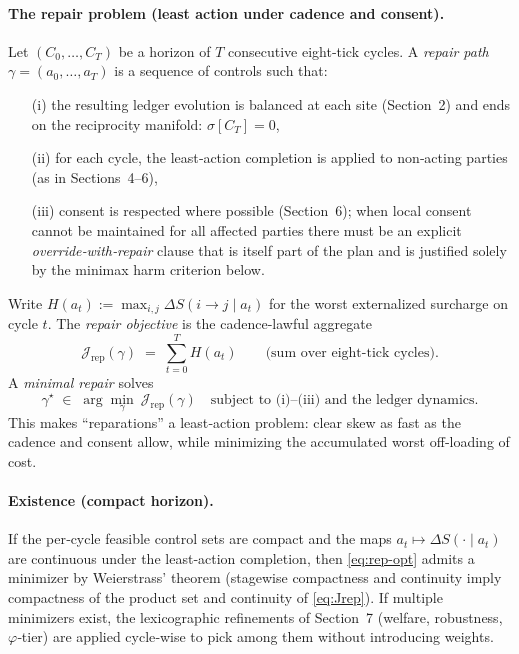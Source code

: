 \documentclass[11pt]{article}
\begin{document}
\paragraph{The repair problem (least action under cadence and consent).}
Let $(C_0,\dots,C_T)$ be a horizon of $T$ consecutive eight‑tick cycles. A \emph{repair path} $\gamma=(a_0,\dots,a_T)$ is a sequence of controls such that:
\begin{enumerate}
\item[(i)] the resulting ledger evolution is balanced at each site (Section~2) and ends on the reciprocity manifold: $\sigma[C_T]=0$,
\item[(ii)] for each cycle, the least‑action completion is applied to non‑acting parties (as in Sections~4–6),
\item[(iii)] consent is respected where possible (Section~6); when local consent cannot be maintained for all affected parties there must be an explicit \emph{override‑with‑repair} clause that is itself part of the plan and is justified solely by the minimax harm criterion below.
\end{enumerate}
Write $H(a_t):=\max_{i,j}\Delta S(i\!\to\! j\mid a_t)$ for the worst externalized surcharge on cycle $t$. The \emph{repair objective} is the cadence‑lawful aggregate
\begin{equation}
\mathcal{J}_{\mathrm{rep}}(\gamma)\;=\;\sum_{t=0}^{T} H(a_t)
\qquad\text{(sum over eight‑tick cycles).}
\label{eq:Jrep}
\end{equation}
A \emph{minimal repair} solves
\begin{equation}
\gamma^\star\;\in\;\arg\min_{\gamma}\ \mathcal{J}_{\mathrm{rep}}(\gamma)
\quad\text{subject to (i)–(iii) and the ledger dynamics.}
\label{eq:rep-opt}
\end{equation}
This makes “reparations” a least‑action problem: clear skew as fast as the cadence and consent allow, while minimizing the accumulated worst off‑loading of cost.

\paragraph{Existence (compact horizon).}
If the per‑cycle feasible control sets are compact and the maps $a_t\mapsto \Delta S(\cdot\mid a_t)$ are continuous under the least‑action completion, then \eqref{eq:rep-opt} admits a minimizer by Weierstrass’ theorem (stagewise compactness and continuity imply compactness of the product set and continuity of \eqref{eq:Jrep}). If multiple minimizers exist, the lexicographic refinements of Section~7 (welfare, robustness, $\varphi$‑tier) are applied cycle‑wise to pick among them without introducing weights.
\end{document}
